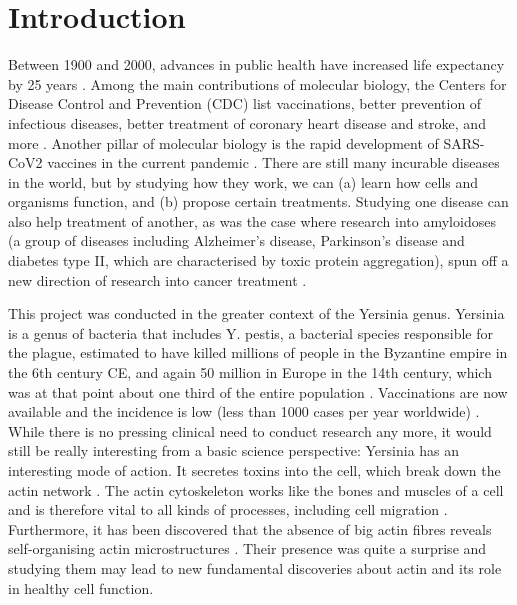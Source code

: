 \chapter{Introduction}
Between 1900 and 2000, advances in public health have increased life expectancy by 25 years \cite{Bunker1994}. Among the main contributions of molecular biology, the Centers for Disease Control and Prevention (CDC) list vaccinations, better prevention of infectious diseases, better treatment of coronary heart disease and stroke, and more \cite{CDC1999}. Another pillar of molecular biology is the rapid development of SARS-CoV2 vaccines in the current pandemic \cite{Sadoff2021, Polack2020}. There are still many incurable diseases in the world, but by studying how they work, we can (a) learn how cells and organisms function, and (b) propose certain treatments. Studying one disease can also help treatment of another, as was the case where research into amyloidoses (a group of diseases including Alzheimer's disease, Parkinson's disease and diabetes type II, which are characterised by toxic protein aggregation), spun off a new direction of research into cancer treatment \cite{Gallardo2016}.

This project was conducted in the greater context of the Yersinia genus. Yersinia is a genus of bacteria that includes Y. pestis, a bacterial species responsible for the plague, estimated to have killed millions of people in the Byzantine empire in the 6th century CE, and again 50 million in Europe in the 14th century, which was at that point about one third of the entire population \cite{Zietz2004}. Vaccinations are now available and the incidence is low (less than 1000 cases per year worldwide) \cite{WHO2014}. 
While there is no pressing clinical need to conduct research any more, it would still be really interesting from a basic science perspective: Yersinia has an interesting mode of action. It secretes toxins into the cell, which break down the actin network \cite{Ono2017}. The actin cytoskeleton works like the bones and muscles of a cell and is therefore vital to all kinds of processes, including cell migration \cite{molbio}. Furthermore, it has been discovered that the absence of big actin fibres reveals self-organising actin microstructures \cite{Fritzsche2017a}. Their presence was quite a surprise and studying them may lead to new fundamental discoveries about actin and its role in healthy cell function.

